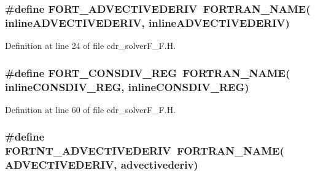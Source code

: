 \subsubsection[{\texorpdfstring{F\+O\+R\+T\+\_\+\+A\+D\+V\+E\+C\+T\+I\+V\+E\+D\+E\+R\+IV}{FORT_ADVECTIVEDERIV}}]{\setlength{\rightskip}{0pt plus 5cm}\#define F\+O\+R\+T\+\_\+\+A\+D\+V\+E\+C\+T\+I\+V\+E\+D\+E\+R\+IV~{\bf F\+O\+R\+T\+R\+A\+N\+\_\+\+N\+A\+ME}( inline\+A\+D\+V\+E\+C\+T\+I\+V\+E\+D\+E\+R\+IV, inline\+A\+D\+V\+E\+C\+T\+I\+V\+E\+D\+E\+R\+IV)}\hypertarget{cdr__solverF__F_8H_a5aaba729adb83ac2d0d21d3a38b9a1fe}{}\label{cdr__solverF__F_8H_a5aaba729adb83ac2d0d21d3a38b9a1fe}


Definition at line 24 of file cdr\+\_\+solver\+F\+\_\+\+F.\+H.

\subsubsection[{\texorpdfstring{F\+O\+R\+T\+\_\+\+C\+O\+N\+S\+D\+I\+V\+\_\+\+R\+EG}{FORT_CONSDIV_REG}}]{\setlength{\rightskip}{0pt plus 5cm}\#define F\+O\+R\+T\+\_\+\+C\+O\+N\+S\+D\+I\+V\+\_\+\+R\+EG~{\bf F\+O\+R\+T\+R\+A\+N\+\_\+\+N\+A\+ME}( inline\+C\+O\+N\+S\+D\+I\+V\+\_\+\+R\+EG, inline\+C\+O\+N\+S\+D\+I\+V\+\_\+\+R\+EG)}\hypertarget{cdr__solverF__F_8H_a385e17564bbca6ee2883c37efd03b931}{}\label{cdr__solverF__F_8H_a385e17564bbca6ee2883c37efd03b931}


Definition at line 60 of file cdr\+\_\+solver\+F\+\_\+\+F.\+H.

\subsubsection[{\texorpdfstring{F\+O\+R\+T\+N\+T\+\_\+\+A\+D\+V\+E\+C\+T\+I\+V\+E\+D\+E\+R\+IV}{FORTNT_ADVECTIVEDERIV}}]{\setlength{\rightskip}{0pt plus 5cm}\#define F\+O\+R\+T\+N\+T\+\_\+\+A\+D\+V\+E\+C\+T\+I\+V\+E\+D\+E\+R\+IV~{\bf F\+O\+R\+T\+R\+A\+N\+\_\+\+N\+A\+ME}( A\+D\+V\+E\+C\+T\+I\+V\+E\+D\+E\+R\+IV, advectivederiv)}\hypertarget{cdr__solverF__F_8H_af58a7c8eedeca35fdb56c2e8f2f511cb}{}\label{cdr__solverF__F_8H_af58a7c8eedeca35fdb56c2e8f2f511cb}


